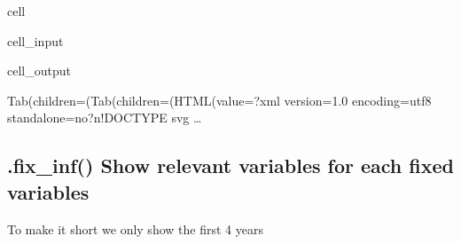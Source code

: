 \documentclass[letterpaper,10pt,english]{jupyterBook}
\begin{document}
\begin{sphinxuseclass}{cell}\begin{sphinxVerbatimInput}

\begin{sphinxuseclass}{cell_input}
\begin{sphinxVerbatim}[commandchars=\\\{\}]
 
    \PYG{p}{[}\PYG{p}{]}
\end{sphinxVerbatim}

\end{sphinxuseclass}\end{sphinxVerbatimInput}
\begin{sphinxVerbatimOutput}

\begin{sphinxuseclass}{cell_output}
\begin{sphinxVerbatim}[commandchars=\\\{\}]
Tab(children=(Tab(children=(HTML(value=\PYGZsq{}\PYGZlt{}?xml version=\PYGZdq{}1.0\PYGZdq{} encoding=\PYGZdq{}utf\PYGZhy{}8\PYGZdq{} standalone=\PYGZdq{}no\PYGZdq{}?\PYGZgt{}\PYGZbs{}n\PYGZlt{}!DOCTYPE svg …
\end{sphinxVerbatim}

\begin{sphinxVerbatim}[commandchars=\\\{\}]

\end{sphinxVerbatim}

\end{sphinxuseclass}\end{sphinxVerbatimOutput}

\end{sphinxuseclass}

\subsection{.fix\_inf() Show relevant variables for each fixed variables}
\label{\detokenize{content/howto/fixing/Fixing variables:fix-inf-show-relevant-variables-for-each-fixed-variables}}
\sphinxAtStartPar
To make it short we only show the first 4 years
\end{document}
